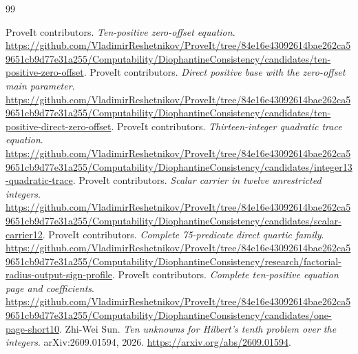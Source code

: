 \begin{thebibliography}{99}
\small\raggedright
{}
ProveIt contributors. \emph{Ten-positive zero-offset equation}.
\url{https://github.com/VladimirReshetnikov/ProveIt/tree/84e16e43092614bae262ca59651cb9d77e31a255/Computability/DiophantineConsistency/candidates/ten-positive-zero-offset}.
ProveIt contributors. \emph{Direct positive base with the zero-offset main parameter}.
\url{https://github.com/VladimirReshetnikov/ProveIt/tree/84e16e43092614bae262ca59651cb9d77e31a255/Computability/DiophantineConsistency/candidates/ten-positive-direct-zero-offset}.
ProveIt contributors. \emph{Thirteen-integer quadratic trace equation}.
\url{https://github.com/VladimirReshetnikov/ProveIt/tree/84e16e43092614bae262ca59651cb9d77e31a255/Computability/DiophantineConsistency/candidates/integer13-quadratic-trace}.
ProveIt contributors. \emph{Scalar carrier in twelve unrestricted integers}.
\url{https://github.com/VladimirReshetnikov/ProveIt/tree/84e16e43092614bae262ca59651cb9d77e31a255/Computability/DiophantineConsistency/candidates/scalar-carrier12}.
ProveIt contributors. \emph{Complete 75-predicate direct quartic family}.
\url{https://github.com/VladimirReshetnikov/ProveIt/tree/84e16e43092614bae262ca59651cb9d77e31a255/Computability/DiophantineConsistency/research/factorial-radius-output-sign-profile}.
ProveIt contributors. \emph{Complete ten-positive equation page and coefficients}.
\url{https://github.com/VladimirReshetnikov/ProveIt/tree/84e16e43092614bae262ca59651cb9d77e31a255/Computability/DiophantineConsistency/candidates/one-page-short10}.
Zhi-Wei Sun. \emph{Ten unknowns for Hilbert's tenth problem over the integers}.
arXiv:2609.01594, 2026. \url{https://arxiv.org/abs/2609.01594}.
\end{thebibliography}

